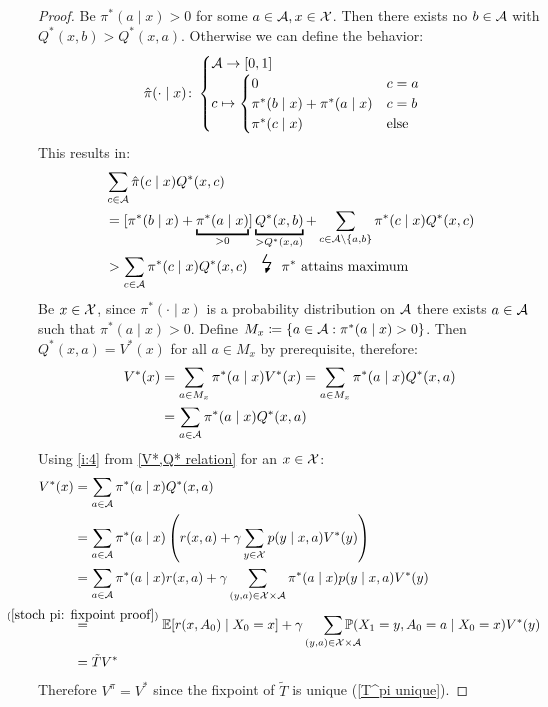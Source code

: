 \begin{proof}
	\xToy{\ref{ii:3}}{\ref{ii:4}} 
	Be \(\pi^*(a\mid x)>0\) for some \(a\in\mathcal{A},x\in\mathcal{X}\). Then there exists no \(b\in\mathcal{A}\) with \(Q^*(x,b)>Q^*(x,a)\). Otherwise we can define the behavior:
	\[
		\hat{\pi}(\cdot\mid x)\colon
		\begin{cases}
			\mathcal{A}\to[0,1]\\
			c\mapsto 
			\begin{cases}
				0 & c=a \\
				\pi^*(b\mid x) + \pi^*(a\mid x) & c=b\\
				\pi^*(c\mid x) & \text{else}
			\end{cases}
		\end{cases}
	\]
	This results in:
	\begin{align*}
		&\sum_{c\in\cA} \hat{\pi}(c\mid x) Q^*(x,c)\\
		&=[\pi^*(b\mid x) %
		+ \underbracket{\pi^*(a\mid x)}_{>0}] \underbracket{Q^*(x,b)}_{>Q^*(x,a)}
		+\sum_{c\in\cA\setminus \{a,b\}} \pi^*(c\mid x)Q^*(x,c)\\
		&> \sum_{c\in\cA} \pi^*(c\mid x) Q^*(x,c) \contradiction{\pi^* \text{ attains maximum}}
	\end{align*}
	\xToy{\ref{ii:4}}{\ref{ii:2}} Be \(x\in\mathcal{X}\), since \(\pi^*(\cdot\mid x)\) is a probability distribution on \(\mathcal{A}\) there exists \(a\in\mathcal{A}\) such that \(\pi^*(a\mid x)>0\). Define \(M_x\coloneqq \{a\in\mathcal{A}:\pi^*(a\mid x)>0 \}\).
	Then \(Q^*(x,a)=V^*(x)\) for all \(a\in M_x\) by prerequisite, therefore:
	\begin{align*}
		V^*(x)&= \sum_{a\in M_x} \pi^*(a\mid x) V^*(x) 
		= \sum_{a\in M_x} \pi^*(a\mid x)Q^*(x,a)\\
		&=\sum_{a\in \mathcal{A}} \pi^*(a\mid x)Q^*(x,a)
	\end{align*}
	\xToy{\ref{ii:2}}{\ref{ii:1}} Using \ref{i:4} from \ref{V*,Q* relation} for an \(x\in\mathcal{X}\):
	\begin{align*}
		V^*(x)&=\sum_{a\in \cA} \pi^*(a\mid x)Q^*(x,a)\\
		&=\sum_{a\in \cA} \pi^*(a\mid x) 
		\left(r(x,a)+\gamma \sum\limits_{y\in\cX}p(y\mid x,a) V^*(y)\right)\\
		&=\sum_{a\in \cA}\pi^*(a\mid x)r(x,a)
		+\gamma \sum_{(y,a)\in\cX\times\cA}\pi^*(a\mid x)p(y\mid x,a)V^*(y)\\
		&\lxeq{(\ref{stoch pi: fixpoint proof})}\E[r(x,A_0)\mid X_0=x] + \gamma \smashoperator[r]{\sum_{(y,a)\in\cX\times\cA}}
		\Pr(X_1=y, A_0=a\mid X_0 =x) V^*(y)\\
		&=\tilde{T}V^*
	\end{align*}
	Therefore \(V^\pi = V^*\) since the fixpoint of \(\tilde{T}\) is unique (\ref{T^pi unique}).
\end{proof}
